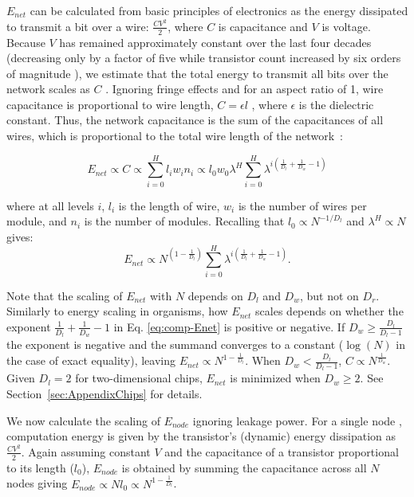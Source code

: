\documentclass[12pt]{article}
\begin{document}
$E_{net}$ can be calculated from basic principles of electronics as the energy
dissipated to transmit a bit over a wire: $\frac{CV^2}{2}$, where $C$ is
capacitance and $V$ is voltage.  Because $V$ has remained approximately
constant over the last four decades (decreasing only by a factor of five while
transistor count increased by six orders of magnitude \cite{ning07}), we
estimate that the total energy to transmit all bits over the network scales as
$C$ \cite{bingham08}.  Ignoring fringe effects and for an aspect ratio of 1,
wire capacitance is proportional to wire length, $C = \epsilon l$
\cite{wilhelm95}, where $\epsilon$ is the dielectric constant. Thus, the
network capacitance is the sum of the capacitances of all wires, which is
proportional to the total wire length of the network~\cite{donath79}:

\begin{equation}
  \label{eq:ChipsEnet}
  E_{net} \propto C \propto  \sum_{i=0}^H l_i w_i n_i \propto l_0 w_0 \lambda^H
\sum_{i=0}^H \lambda^{i \left( \frac{1}{D_l} + \frac{1}{D_w} -1  \right)} 
\end{equation}

\noindent where at all levels $i$, $l_i$ is the length of wire, $w_i$ is the number of wires per
module, and $n_i$ is the number of modules. Recalling that
$l_0 \propto N^{-1/D_l}$ and $\lambda^H \propto N$ gives: 
\begin{equation}
\label{eq:comp-Enet}
  E_{net}  \propto  N^{(1- \frac{1}{D_l})} \sum_{i=0}^H \lambda^{i \left( 
\frac{1}{D_l} + \frac{1}{D_w} -1 \right)} .
\end{equation}

\noindent Note that the scaling of $E_{net} $ with $N$ depends on $D_l$ and
$D_w$, but not on $D_r$. Similarly to energy scaling in
organisms, how $E_{net}$ scales depends on whether the exponent
$\frac{1}{D_l} + \frac{1}{D_w}-1$ in Eq. \ref {eq:comp-Enet} is positive or
negative.  If $D_w \geq \frac{D_l}{D_l -1}$ the exponent is negative and the
summand converges to a constant ($\log(N)$ in the case of exact equality),
leaving $E_{net} \propto N^{1-\frac{1}{D_l}}$. When $D_w < \frac{D_l}{D_l -1}$,
$C \propto N^{\frac{1}{D_w}}$. Given $D_l = 2$ for two-dimensional chips, $E_{net}$
is minimized when $D_w \geq 2$. See Section~\ref{sec:AppendixChips} for
details.

We now calculate the scaling of $E_{node}$ ignoring leakage power. 
For a single node , computation
energy is given by the transistor's (dynamic) energy dissipation as
$\frac{CV^2}{2}$. Again assuming constant $V$ and the capacitance of a
transistor proportional to its length ($l_0$), $E_{node}$ is obtained
by summing
the capacitance across all $N$ nodes giving $E_{node} \propto N l_0  \propto
N^{1-\frac{1}{D_l}}$. 
\end{document}

